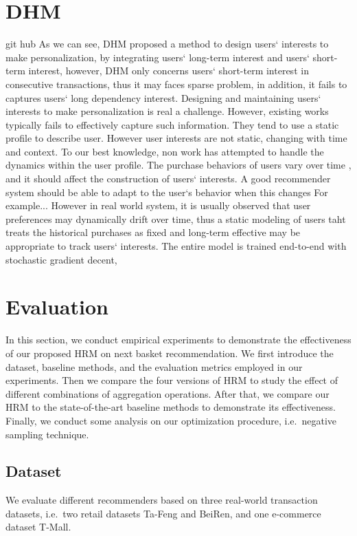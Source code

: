 \documentclass[10pt,journal,compsoc]{IEEEtran}
\begin{document}
\section{DHM}
git hub
As we can see, DHM proposed a method to design users` interests to make personalization, by integrating users` long-term interest and users` short-term interest, however, DHM only concerns users` short-term interest in consecutive transactions, thus it may faces sparse problem, in addition, it fails to captures users` long dependency interest.
Designing and maintaining users` interests to make personalization is real a challenge.
However, existing works typically fails to effectively capture such information. They tend to use a static profile to describe user. However user interests are not static, changing with time and context. To our best knowledge, non work has attempted to handle the dynamics within the user profile. The purchase behaviors of users vary over time , and it should affect the construction of users` interests. A good recommender system should be able to adapt to the user`s behavior when this changes For example...
However in real world system, it is usually observed that user preferences may dynamically drift over time, thus a static modeling of users taht treats the historical purchases as fixed and long-term effective may be appropriate to track users` interests.
The entire model is trained end-to-end with stochastic gradient decent,
\section{Evaluation}
In this section, we conduct empirical experiments to demonstrate the effectiveness of our proposed HRM on next basket recommendation. We first introduce the dataset, baseline methods, and the evaluation metrics employed in our experiments. Then we compare the four versions of HRM to study the effect of different combinations of aggregation operations. After that, we compare our HRM to the state-of-the-art baseline methods to demonstrate its effectiveness. Finally, we conduct some analysis on our optimization procedure, i.e.~negative sampling technique.

\subsection{Dataset}
We evaluate different recommenders based on three real-world transaction datasets, i.e.~two retail datasets Ta-Feng and BeiRen, and one e-commerce dataset T-Mall.
\end{document}
